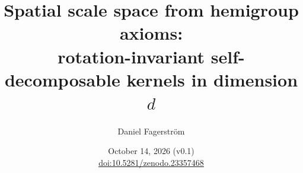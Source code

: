 \documentclass[11pt]{article}
\title{Spatial scale space from hemigroup axioms:\\
rotation-invariant self-decomposable kernels in dimension $d$}
\author{Daniel Fagerstr\"om}
\date{October 14, 2026 (v0.1)\\[3pt] {\normalsize \href{https://doi.org/10.5281/zenodo.23357468}{doi:10.5281/zenodo.23357468}}}
\begin{document}
\maketitle








\appendix


\ifdefined\isofull
  
  
  
  
\fi





\end{document}

